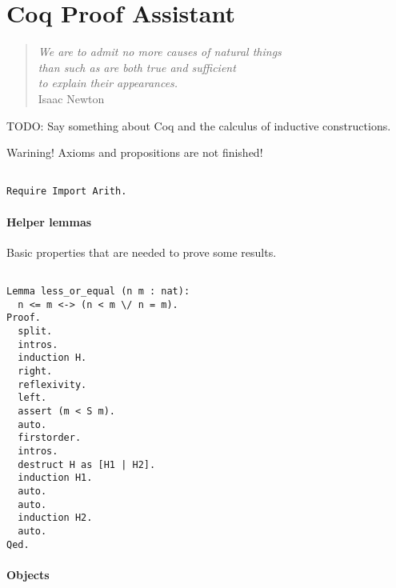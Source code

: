 %
%


\chapter{Coq Proof Assistant}
\label{apx:coq}

\begin{quote}
\begin{flushright}
\emph{We are to admit no more causes of natural things \\
than such as are both true and sufficient \\
to explain their appearances.}\\
Isaac Newton
\end{flushright}
\end{quote}
\bigskip

{\color{red} TODO: Say something about Coq and the calculus of inductive constructions.}

{\color{red} Warining! Axioms and propositions are not finished!}

\begin{sourcecode}
{\scriptsize \begin{verbatim}

Require Import Arith.

\end{verbatim}}
\end{sourcecode}

\subsubsection*{Helper lemmas}

Basic properties that are needed to prove some results.

\begin{sourcecode}
{\scriptsize \begin{verbatim}

Lemma less_or_equal (n m : nat):
  n <= m <-> (n < m \/ n = m).
Proof.
  split.
  intros.
  induction H.
  right.
  reflexivity.
  left.
  assert (m < S m).
  auto.
  firstorder.
  intros.
  destruct H as [H1 | H2].
  induction H1.
  auto.
  auto.
  induction H2.
  auto.
Qed.

\end{verbatim}}
\end{sourcecode}

\subsubsection*{Objects}

